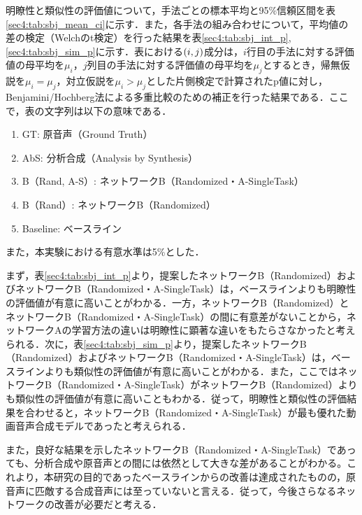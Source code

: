 明瞭性と類似性の評価値について，手法ごとの標本平均と95\%信頼区間を表\ref{sec4:tab:sbj_mean_ci}に示す．また，各手法の組み合わせについて，平均値の差の検定（Welchのt検定）を行った結果を表\ref{sec4:tab:sbj_int_p}, \ref{sec4:tab:sbj_sim_p}に示す．表における$\left(i, j\right)$成分は，$i$行目の手法に対する評価値の母平均を$\mu_{i}$，$j$列目の手法に対する評価値の母平均を$\mu_{j}$とするとき，帰無仮説を$\mu_{i} = \mu_{j}$，対立仮説を$\mu_{i} > \mu_{j}$とした片側検定で計算されたp値に対し，Benjamini/Hochberg法による多重比較のための補正を行った結果である．ここで，表の文字列は以下の意味である．
\begin{enumerate}
    \item GT: 原音声（Ground Truth）
    \item AbS: 分析合成（Analysis by Synthesis）
    \item B（Rand, A-S）: ネットワークB（Randomized・A-SingleTask）
    \item B（Rand）: ネットワークB（Randomized）
    \item Baseline: ベースライン
\end{enumerate}
また，本実験における有意水準は5\%とした．

まず，表\ref{sec4:tab:sbj_int_p}より，提案したネットワークB（Randomized）およびネットワークB（Randomized・A-SingleTask）は，ベースラインよりも明瞭性の評価値が有意に高いことがわかる．一方，ネットワークB（Randomized）とネットワークB（Randomized・A-SingleTask）の間に有意差がないことから，ネットワークAの学習方法の違いは明瞭性に顕著な違いをもたらさなかったと考えられる．次に，表\ref{sec4:tab:sbj_sim_p}より，提案したネットワークB（Randomized）およびネットワークB（Randomized・A-SingleTask）は，ベースラインよりも類似性の評価値が有意に高いことがわかる．また，ここではネットワークB（Randomized・A-SingleTask）がネットワークB（Randomized）よりも類似性の評価値が有意に高いこともわかる．従って，明瞭性と類似性の評価結果を合わせると，ネットワークB（Randomized・A-SingleTask）が最も優れた動画音声合成モデルであったと考えられる．

また，良好な結果を示したネットワークB（Randomized・A-SingleTask）であっても、分析合成や原音声との間には依然として大きな差があることがわかる。これより，本研究の目的であったベースラインからの改善は達成されたものの，原音声に匹敵する合成音声には至っていないと言える．従って，今後さらなるネットワークの改善が必要だと考える．

